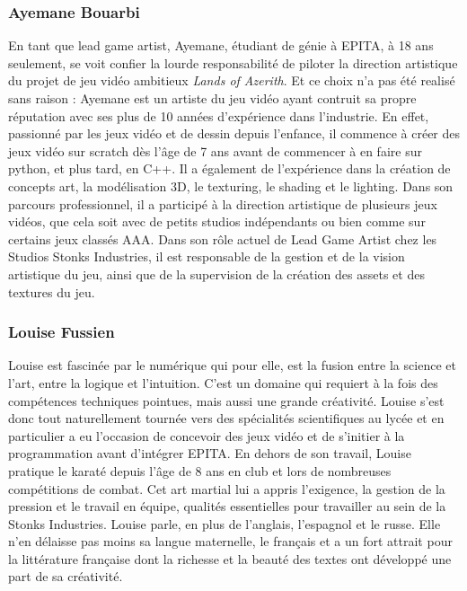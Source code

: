\subsubsection{Ayemane Bouarbi}
En tant que lead game artist, Ayemane, étudiant de génie à EPITA, à 18 ans seulement, se voit confier la lourde responsabilité de piloter la direction artistique du projet de jeu vidéo    ambitieux \textit{Lands of Azerith}.
Et ce choix n'a pas été realisé sans raison : Ayemane est un artiste du jeu vidéo ayant contruit sa propre réputation avec ses plus de 10 années d'expérience dans l'industrie.
En effet, passionné par les jeux vidéo et de dessin depuis l'enfance, il commence à créer des jeux vidéo sur scratch dès l'âge de 7 ans avant de commencer à en faire sur python, et plus tard, en C++.
Il a également de l'expérience dans la création de concepts art, la modélisation 3D, le texturing, le shading et le lighting.
Dans son parcours professionnel, il a participé à la direction artistique de plusieurs jeux vidéos, que cela soit avec de petits studios indépendants ou bien comme sur certains jeux classés AAA.
Dans son rôle actuel de Lead Game Artist chez les Studios Stonks Industries, il est responsable de la gestion et de la vision artistique du jeu, ainsi que de la supervision de la création des assets et des textures du jeu.

\subsubsection{Louise Fussien}

Louise est fascinée par le numérique qui pour elle, est la fusion entre la science et l'art, entre la logique et l'intuition.
C'est un domaine qui requiert à la fois des compétences techniques pointues, mais aussi une grande créativité.
Louise s'est donc tout naturellement tournée vers des spécialités scientifiques au lycée et en particulier a eu l'occasion de concevoir des jeux vidéo et de s'initier à la programmation avant d'intégrer EPITA.
En dehors de son travail, Louise pratique le karaté depuis l'âge de 8 ans en club et lors de nombreuses compétitions de combat.
Cet art martial lui a appris l'exigence, la gestion de la pression et le travail en équipe, qualités essentielles pour travailler au sein de la Stonks Industries.
Louise parle, en plus de l'anglais, l'espagnol et le russe. Elle n'en délaisse pas moins sa langue maternelle,
le français et a un fort attrait pour la littérature française dont la richesse et la beauté des textes ont développé une part de sa créativité.

